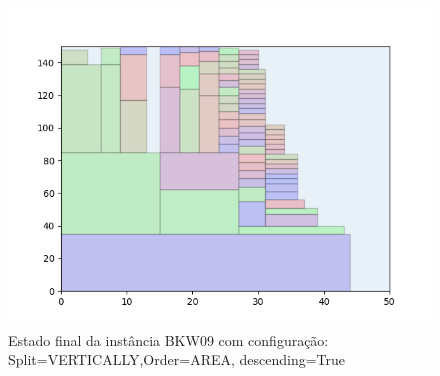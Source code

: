 \begin{figure}[H]
    \centering
    \caption[]{Estado final da instância BKW09 com configuração: Split=VERTICALLY,Order=AREA, descending=True}
    \label{fig:bkw09-vertically-area-true}
    \includegraphics[scale=0.5]{output/figures/bkw/bkw09/vertically/area/true/000}
\end{figure}